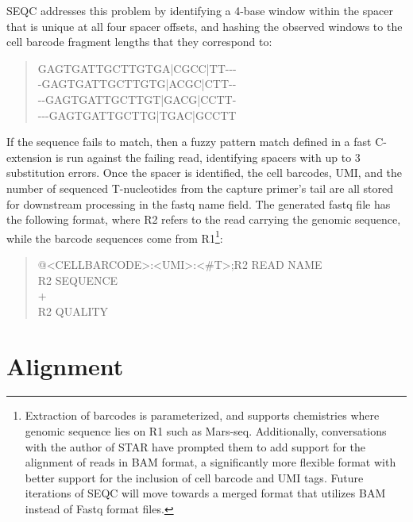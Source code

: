 SEQC addresses this problem by identifying a 4-base window within the spacer that is unique at all four spacer offsets, and hashing the observed windows to the cell barcode fragment lengths that they correspond to: 
\begin{quote}
\onehalfspacing
{\mono
  GAGTGATTGCTTGTGA|CGCC|TT-{}-{}-\\ %
  -GAGTGATTGCTTGTG|ACGC|CTT-{}-\\ 
  -{}-GAGTGATTGCTTGT|GACG|CCTT-\\ 
  -{}-{}-GAGTGATTGCTTG|TGAC|GCCTT
}
\end{quote}
If the sequence fails to match, then a fuzzy pattern match defined in a fast C-extension is run against the failing read, identifying spacers with up to 3 substitution errors. 
Once the spacer is identified, the cell barcodes, UMI, and the number of sequenced T-nucleotides from the capture primer's tail are all stored for downstream processing in the fastq name field. 
The generated fastq file has the following format, where {\mono R2} refers to the read carrying the genomic sequence, while the barcode sequences come from R1\footnote{Extraction of barcodes is parameterized, and supports chemistries where genomic sequence lies on R1 such as Mars-seq. Additionally, conversations with the author of STAR have prompted them to add support for the alignment of reads in BAM format, a significantly more flexible format with better support for the inclusion of cell barcode and UMI tags. Future iterations of SEQC will move towards a merged format that utilizes BAM instead of Fastq format files.}:
\begin{quote}
\onehalfspacing
{\mono
  @<CELLBARCODE>:<UMI>:<\#T>;R2 READ NAME\\ 
  R2 SEQUENCE\\
  +\\
  R2 QUALITY
}
\end{quote}

\section{Alignment} %

